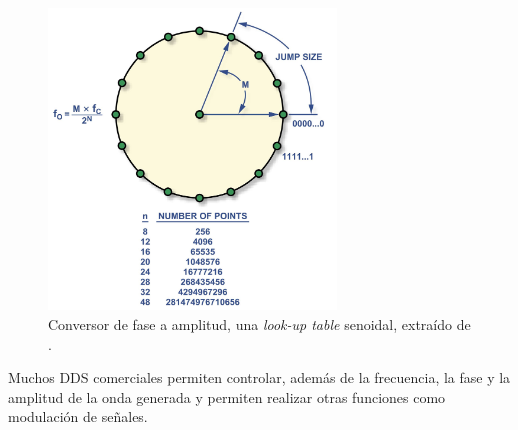 \documentclass{article}
\newenvironment{standalone}{\begin{preview}}{\end{preview}}
\begin{document}
\begin{standalone}
  \begin{figure}[!htbp]
    \centering
    \includegraphics[width=\linewidth, height=80mm, keepaspectratio]{../images/phase2amplitude-converter.jpg}
    \caption{Conversor de fase a amplitud, una \textit{look-up table} senoidal, extraído de \cite{murphy2004}.}
    \label{fig:look-up-table}
  \end{figure}

  Muchos DDS comerciales permiten controlar, además de la frecuencia, la fase y la amplitud de la onda generada y permiten realizar otras funciones como modulación de señales.

\end{standalone}
\end{document}
